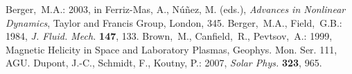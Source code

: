 \documentclass[namedreferences]{SolarPhysics}
\newcommand{\solphys}{{\it Solar Phys.}}
\begin{document}
\begin{article}
\begin{thebibliography}{}
Berger,~M.A.: 
2003, in Ferriz-Mas, A., N{\'u}{\~n}ez, M. (eds.),
    \textit{Advances in Nonlinear Dynamics}, Taylor and Francis Group, 
    London, 345.
Berger,~M.A., Field,~G.B.: 
1984, \textit{J. Fluid. Mech.} \textbf{147}, 133.
Brown,~M., Canfield,~R., Pevtsov,~A.:
1999, Magnetic Helicity in Space and Laboratory Plasmas, Geophys. Mon. 
      Ser. 111, AGU.
Dupont, J.-C., Schmidt, F., Koutny, P.: 2007, \solphys{} \textbf{323}, 965. 
\end{thebibliography}

\end{article} 
\end{document}
